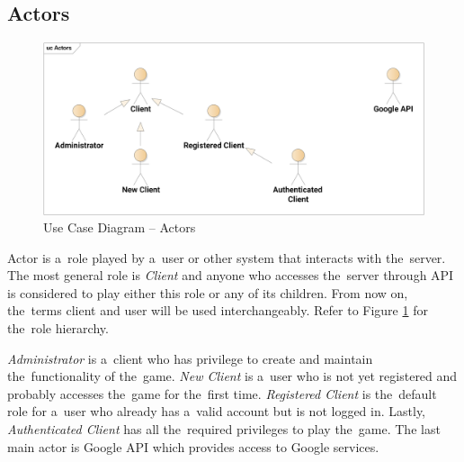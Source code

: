 	\subsection{Actors}
		\begin{figure}[h]	
			\includegraphics[width=\textwidth]{figures/UC_Actors}
			\centering			
			\caption{Use Case
				 Diagram -- Actors}
			\label{fig:ucactors}
		\end{figure}
		\noindent Actor is a~role played by a~user or other system that interacts with the~server. The most general role is \textit{Client} and anyone who accesses the~server through API is considered to play either this role or any of its children. From now on, the~terms client and user will be used interchangeably. Refer to Figure \ref{fig:ucactors} for the~role hierarchy.
		
		\textit{Administrator} is a~client who has privilege to create and maintain the~functionality of the~game. \textit{New Client} is a~user who is not yet registered and probably accesses the~game for the~first time. \textit{Registered Client} is the~default role for a~user who already has a~valid account but is not logged in. Lastly, \textit{Authenticated Client} has all the~required privileges to play the~game. The last main actor is Google API which provides access to Google services. 		

